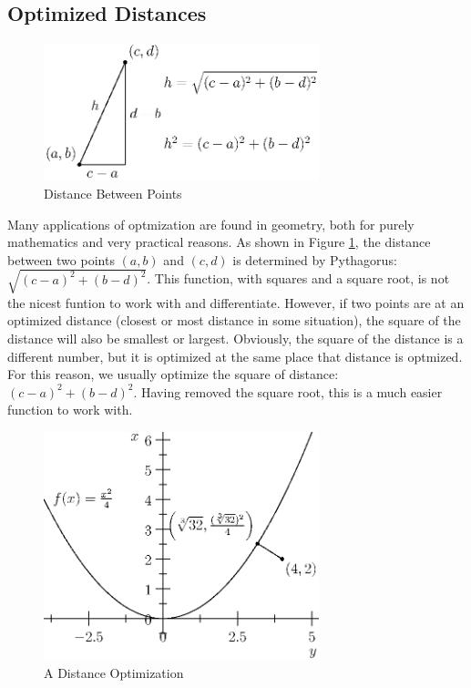 \documentclass[fleqn]{report}
\begin{document}
\subsection{Optimized Distances}
\label{optmized-distances}

\begin{figure}[ht]
\centering
\includegraphics[width=8cm]{figure65.eps}
\caption{Distance Between Points}
\label{figure-distance-between-points}
\end{figure}

Many applications of optmization are found in geometry, both
for purely mathematics and very practical reasons. As shown in
Figure \ref{figure-distance-between-points}, the distance between two
points $(a,b)$ and $(c,d)$ is determined by Pythagorus:
$\sqrt{(c-a)^2 + (b-d)^2}$. This function, with squares and a
square root, is not the nicest funtion to work with and
differentiate. However, if two points are at an optimized
distance (closest or most distance in some situation), the
square of the distance will also be smallest or largest.
Obviously, the square of the distance is a different number,
but it is optimized at the same place that distance is
optmized. For this reason, we usually optimize the square of
distance: $(c-a)^2 + (b-d)^2$. Having removed the square root,
this is a much easier function to work with.

\begin{figure}[ht]
\centering
\includegraphics[width=8cm]{figure66.eps}
\caption{A Distance Optimization}
\label{figure-distance-optimization}
\end{figure}
\end{document}
